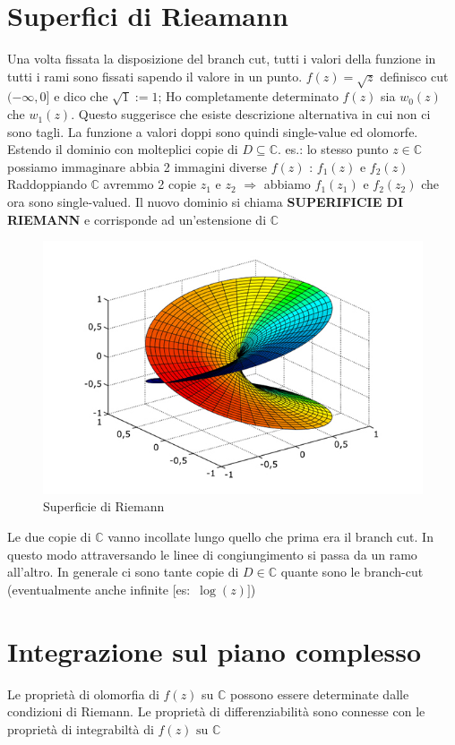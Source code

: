 \documentclass[a4paper,11pt]{report}
\theoremstyle{remark}
\theoremstyle{definition}
\newcommand{\C}{\mathbb{C}}
\begin{document}
\chapter{Superfici di Rieamann}
	Una volta fissata la disposizione del branch cut, tutti i valori della funzione in tutti i rami sono fissati sapendo il valore in un punto. \newline
	$f(z)=\sqrt{z}$ definisco cut $(-\infty,0]$ e dico che $\sqrt{1}:=1$; Ho completamente determinato $f(z)$ sia $w_0(z)$ che $w_1(z)$. \newline
	Questo suggerisce che esiste descrizione alternativa in cui non ci sono tagli. \newline
	La funzione a valori doppi sono quindi single-value ed olomorfe. \newline
	Estendo il dominio con molteplici copie di $D \subseteq \mathbb{C}$. \newline
	es.: lo stesso punto $z \in \mathbb{C}$ possiamo immaginare abbia 2 immagini diverse $f(z)$ : $f_1(z)$ e $f_2(z)$ \newline
	Raddoppiando $\mathbb{C}$ avremmo 2 copie $z_1$ e $z_2$ $\Rightarrow$ abbiamo $f_1(z_1)$ e $f_2(z_2)$ che ora sono single-valued. \newline
	Il nuovo dominio si chiama {\bfseries SUPERIFICIE DI RIEMANN}  e corrisponde ad un'estensione di $\mathbb{C}$
	\begin{figure}[h]
		\centering
		\includegraphics[width=0.7\linewidth]{immagini/riemann.jpg}
		\caption{Superficie di Riemann}
		\label{fig:riemann}
	\end{figure}
	\noindent Le due copie di $\C$ vanno incollate lungo quello che prima era il branch cut. In questo modo attraversando le linee di congiungimento si passa da un ramo all'altro. \newline
	In generale ci sono tante copie di $D \in \mathbb{C}$ quante sono le branch-cut (eventualmente anche infinite [es:~$\log(z)]$)
	\chapter{Integrazione sul piano complesso}	
	Le proprietà di olomorfia di $f(z)$ su $\mathbb{C}$ possono essere determinate dalle condizioni di Riemann. \newline
	Le proprietà di differenziabilità sono connesse con le proprietà di integrabiltà di $f(z) \mbox{ su } \mathbb{C}$ 
\end{document}
